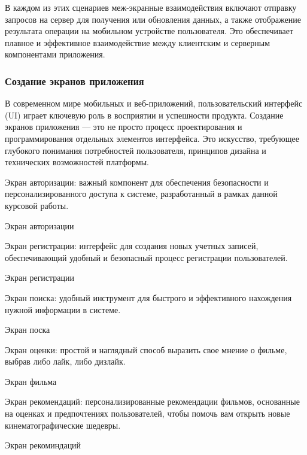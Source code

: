 В каждом из этих сценариев меж-экранные взаимодействия включают отправку запросов на сервер для получения или
обновления данных, а также отображение результата операции на мобильном устройстве пользователя.
Это обеспечивает плавное и эффективное взаимодействие между клиентским и серверным компонентами приложения.


\subsubsection{Создание экранов приложения}

В современном мире мобильных и веб-приложений, пользовательский интерфейс (UI) играет ключевую роль в восприятии и
успешности продукта.
Создание экранов приложения — это не просто процесс проектирования и программирования отдельных элементов интерфейса.
Это искусство, требующее глубокого понимания потребностей пользователя, принципов дизайна и технических возможностей
платформы.

Экран авторизации: важный компонент для обеспечения безопасности и персонализированного доступа к системе,
разработанный в рамках данной курсовой работы.

\begin{image}
	\caption{Экран авторизации}
	\label{engineering:login}
\end{image}

\clearpage

Экран регистрации: интерфейс для создания новых учетных записей, обеспечивающий удобный и безопасный процесс
регистрации пользователей.

\begin{image}
	\caption{Экран регистрации}
	\label{engineering:signup}
\end{image}
Экран поиска: удобный инструмент для быстрого и эффективного нахождения нужной информации в системе.
\begin{image}
	\caption{Экран поска}
	\label{engineering:find}
\end{image}
\clearpage
Экран оценки: простой и наглядный способ выразить свое мнение о фильме, выбрав либо лайк, либо дизлайк.

\begin{image}
	\caption{Экран фильма}
	\label{engineering:film}
\end{image}

Экран рекомендаций: персонализированные рекомендации фильмов, основанные на оценках и предпочтениях пользователей,
чтобы помочь вам открыть новые кинематографические шедевры.
\begin{image}
	\caption{Экран рекоминдаций}
	\label{engineering:recom}
\end{image}

